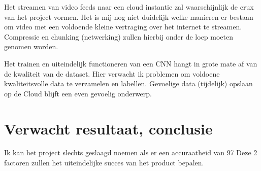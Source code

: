 Het streamen van video feeds naar een cloud instantie zal waarschijnlijk de crux van het project vormen. Het is mij nog niet duidelijk welke manieren er bestaan om video met een voldoende kleine vertraging over het internet te streamen.
Compressie en chunking (netwerking) zullen hierbij onder de loep moeten genomen worden.

Het trainen en uiteindelijk functioneren van een CNN hangt in grote mate af van de kwaliteit van de dataset. Hier verwacht ik problemen om voldoene kwaliteitsvolle data te verzamelen en labellen.
Gevoelige data (tijdelijk) opslaan op de Cloud blijft een even gevoelig onderwerp.
\section{Verwacht resultaat, conclusie}%
\label{sec:verwachte_resultaten}

Ik kan het project slechts geslaagd noemen als er een accuraatheid van 97%
Deze 2 factoren zullen het uiteindelijke succes van het product bepalen.